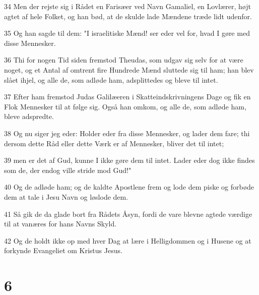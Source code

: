 \par 34 Men der rejste sig i Rådet en Farisæer ved Navn Gamaliel, en Lovlærer, højt agtet af hele Folket, og han bød, at de skulde lade Mændene træde lidt udenfor.
\par 35 Og han sagde til dem: "I israelitiske Mænd! ser eder vel for, hvad I gøre med disse Mennesker.
\par 36 Thi for nogen Tid siden fremstod Theudas, som udgav sig selv for at være noget, og et Antal af omtrent fire Hundrede Mænd sluttede sig til ham; han blev slået ihjel, og alle de, som adløde ham, adsplittedes og bleve til intet.
\par 37 Efter ham fremstod Judas Galilæeren i Skatteindskrivningens Dage og fik en Flok Mennesker til at følge sig. Også han omkom, og alle de, som adløde ham, bleve adspredte.
\par 38 Og nu siger jeg eder: Holder eder fra disse Mennesker, og lader dem fare; thi dersom dette Råd eller dette Værk er af Mennesker, bliver det til intet;
\par 39 men er det af Gud, kunne I ikke gøre dem til intet. Lader eder dog ikke findes som de, der endog ville stride mod Gud!"
\par 40 Og de adløde ham; og de kaldte Apostlene frem og lode dem piske og forbøde dem at tale i Jesu Navn og løslode dem.
\par 41 Så gik de da glade bort fra Rådets Åsyn, fordi de vare blevne agtede værdige til at vanæres for hans Navns Skyld.
\par 42 Og de holdt ikke op med hver Dag at lære i Helligdommen og i Husene og at forkynde Evangeliet om Kristus Jesus.

\chapter{6}

